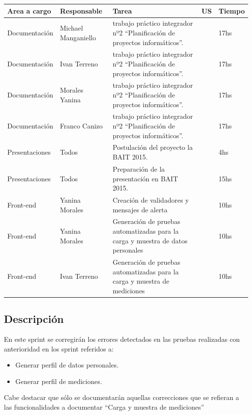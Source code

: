 	{\scriptsize
	\begin{center} %
	\centering
    \resizebox{\textwidth}{!}
    {
	\begin{tabular}{|l|l|p{5cm}|l|l|}
	    \hline
	        \textbf{Area a cargo} &
	        \textbf{Responsable} &        
	        \textbf{Tarea} &
	        \textbf{US} &
            \textbf{Tiempo}\\
   		\hline
       
	    Documentación& Michael Manganiello & trabajo práctico integrador nº2 ``Planificación de proyectos informáticos''. & & 17hs \\ \hline
        Documentación& Ivan Terreno & trabajo práctico integrador nº2 ``Planificación de proyectos informáticos''. & & 17hs \\ \hline
        Documentación& Morales Yanina & trabajo práctico integrador nº2 ``Planificación de proyectos informáticos''. & & 17hs \\ \hline
        Documentación& Franco Canizo & trabajo práctico integrador nº2 ``Planificación de proyectos informáticos''. & & 17hs \\ \hline
        Presentaciones& Todos & Postulación del proyecto la BAIT 2015. & & 4hs \\ \hline
        Presentaciones& Todos & Preparación de la presentación en BAIT 2015. & & 15hs \\ \hline        
	    Front-end& Yanina Morales & Creación de validadores y mensajes de alerta & & 10hs\\ \hline   
	    Front-end& Yanina Morales & Generación de pruebas automatizadas para la carga y muestra de datos personales& & 10hs\\ \hline  
	    Front-end& Ivan Terreno & Generación de pruebas automatizadas para la carga y muestra de mediciones & & 10hs\\ \hline  	              
	    \end{tabular}
        }
    	\end{center}
	}


\subsection{Descripción}
En este sprint se corregirán los errores detectados en las pruebas realizadas con anterioridad en los sprint referidos a:
    \begin{itemize}
    \item Generar perfil de datos personales.
    \item Generar  perfil de mediciones.
    \end{itemize}
Cabe destacar que sólo se documentarán aquellas correcciones que se refieran a las funcionalidades a documentar ``Carga y muestra de mediciones''

